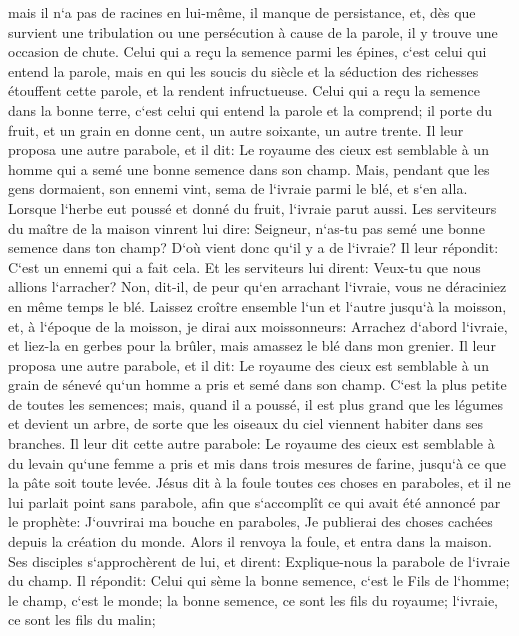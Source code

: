 \verse mais il n`a pas de racines en lui-même, il manque de persistance, et, dès que survient une tribulation ou une persécution à cause de la parole, il y trouve une occasion de chute. 
\verse Celui qui a reçu la semence parmi les épines, c`est celui qui entend la parole, mais en qui les soucis du siècle et la séduction des richesses étouffent cette parole, et la rendent infructueuse. 
\verse Celui qui a reçu la semence dans la bonne terre, c`est celui qui entend la parole et la comprend; il porte du fruit, et un grain en donne cent, un autre soixante, un autre trente. 
\verse Il leur proposa une autre parabole, et il dit: Le royaume des cieux est semblable à un homme qui a semé une bonne semence dans son champ. 
\verse Mais, pendant que les gens dormaient, son ennemi vint, sema de l`ivraie parmi le blé, et s`en alla. 
\verse Lorsque l`herbe eut poussé et donné du fruit, l`ivraie parut aussi. 
\verse Les serviteurs du maître de la maison vinrent lui dire: Seigneur, n`as-tu pas semé une bonne semence dans ton champ? D`où vient donc qu`il y a de l`ivraie? 
\verse Il leur répondit: C`est un ennemi qui a fait cela. Et les serviteurs lui dirent: Veux-tu que nous allions l`arracher? 
\verse Non, dit-il, de peur qu`en arrachant l`ivraie, vous ne déraciniez en même temps le blé. 
\verse Laissez croître ensemble l`un et l`autre jusqu`à la moisson, et, à l`époque de la moisson, je dirai aux moissonneurs: Arrachez d`abord l`ivraie, et liez-la en gerbes pour la brûler, mais amassez le blé dans mon grenier. 
\verse Il leur proposa une autre parabole, et il dit: Le royaume des cieux est semblable à un grain de sénevé qu`un homme a pris et semé dans son champ. 
\verse C`est la plus petite de toutes les semences; mais, quand il a poussé, il est plus grand que les légumes et devient un arbre, de sorte que les oiseaux du ciel viennent habiter dans ses branches. 
\verse Il leur dit cette autre parabole: Le royaume des cieux est semblable à du levain qu`une femme a pris et mis dans trois mesures de farine, jusqu`à ce que la pâte soit toute levée. 
\verse Jésus dit à la foule toutes ces choses en paraboles, et il ne lui parlait point sans parabole, 
\verse afin que s`accomplît ce qui avait été annoncé par le prophète: J`ouvrirai ma bouche en paraboles, Je publierai des choses cachées depuis la création du monde. 
\verse Alors il renvoya la foule, et entra dans la maison. Ses disciples s`approchèrent de lui, et dirent: Explique-nous la parabole de l`ivraie du champ. 
\verse Il répondit: Celui qui sème la bonne semence, c`est le Fils de l`homme; 
\verse le champ, c`est le monde; la bonne semence, ce sont les fils du royaume; l`ivraie, ce sont les fils du malin; 
